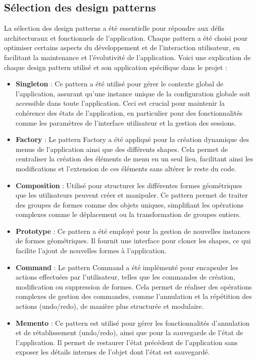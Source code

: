 \documentclass[a4paper,11pt]{article}
\begin{document}
\pagebreak

\subsection{Sélection des design patterns}
La sélection des design patterns a été essentielle pour répondre aux défis architecturaux et fonctionnels de l'application. Chaque pattern a été choisi pour optimiser certains aspects du développement et de l'interaction utilisateur, en facilitant la maintenance et l'évolutivité de l'application. Voici une explication de chaque design pattern utilisé et son application spécifique dans le projet :

\begin{itemize}
    \item \textbf{Singleton} : Ce pattern a été utilisé pour gérer le contexte global de l'application, assurant qu'une instance unique de la configuration globale soit accessible dans toute l'application. Ceci est crucial pour maintenir la cohérence des états de l'application, en particulier pour des fonctionnalités comme les paramètres de l'interface utilisateur et la gestion des sessions.

    \item \textbf{Factory} : Le pattern Factory a été appliqué pour la création dynamique des menus de l'application ainsi que des différents shapes. Cela permet de centraliser la création des éléments de menu en un seul lieu, facilitant ainsi les modifications et l'extension de ces éléments sans altérer le reste du code.

    \item \textbf{Composition} : Utilisé pour structurer les différentes formes géométriques que les utilisateurs peuvent créer et manipuler. Ce pattern permet de traiter des groupes de formes comme des objets uniques, simplifiant les opérations complexes comme le déplacement ou la transformation de groupes entiers.

    \item \textbf{Prototype} : Ce pattern a été employé pour la gestion de nouvelles instances de formes géométriques. Il fournit une interface pour cloner les shapes, ce qui facilite l'ajout de nouvelles formes à l'application.

    \item \textbf{Command} : Le pattern Command a été implémenté pour encapsuler les actions effectuées par l'utilisateur, telles que les commandes de création, modification ou suppression de formes. Cela permet de réaliser des opérations complexes de gestion des commandes, comme l'annulation et la répétition des actions (undo/redo), de manière plus structurée et modulaire.

    \item \textbf{Memento} : Ce pattern est utilisé pour gérer les fonctionnalités d'annulation et de rétablissement (undo/redo), ainsi que pour la sauvegarde de l'état de l'application. Il permet de restaurer l'état précédent de l'application sans exposer les détails internes de l'objet dont l'état est sauvegardé.

\end{itemize}
\pagebreak
\end{document}
